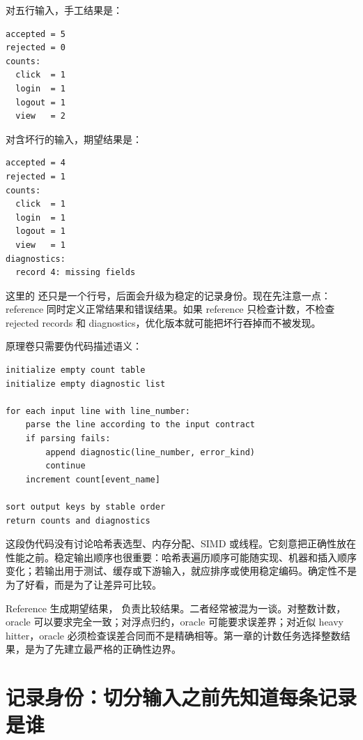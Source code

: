 对五行输入，手工结果是：

\begin{lstlisting}[numbers=none,caption={手工期望结果}]
accepted = 5
rejected = 0
counts:
  click  = 1
  login  = 1
  logout = 1
  view   = 2
\end{lstlisting}

对含坏行的输入，期望结果是：

\begin{lstlisting}[numbers=none,caption={含坏行的期望结果}]
accepted = 4
rejected = 1
counts:
  click  = 1
  login  = 1
  logout = 1
  view   = 1
diagnostics:
  record 4: missing fields
\end{lstlisting}

这里的  还只是一个行号，后面会升级为稳定的记录身份。现在先注意一点：reference 同时定义正常结果和错误结果。如果 reference 只检查计数，不检查 rejected records 和 diagnostics，优化版本就可能把坏行吞掉而不被发现。

原理卷只需要伪代码描述语义：

\begin{lstlisting}[numbers=none,caption={reference 的语义伪代码}]
initialize empty count table
initialize empty diagnostic list

for each input line with line_number:
    parse the line according to the input contract
    if parsing fails:
        append diagnostic(line_number, error_kind)
        continue
    increment count[event_name]

sort output keys by stable order
return counts and diagnostics
\end{lstlisting}

这段伪代码没有讨论哈希表选型、内存分配、SIMD 或线程。它刻意把正确性放在性能之前。稳定输出顺序也很重要：哈希表遍历顺序可能随实现、机器和插入顺序变化；若输出用于测试、缓存或下游输入，就应排序或使用稳定编码。确定性不是为了好看，而是为了让差异可比较。

Reference 生成期望结果， 负责比较结果。二者经常被混为一谈。对整数计数，oracle 可以要求完全一致；对浮点归约，oracle 可能要求误差界；对近似 heavy hitter，oracle 必须检查误差合同而不是精确相等。第一章的计数任务选择整数结果，是为了先建立最严格的正确性边界。

\section{记录身份：切分输入之前先知道每条记录是谁}

